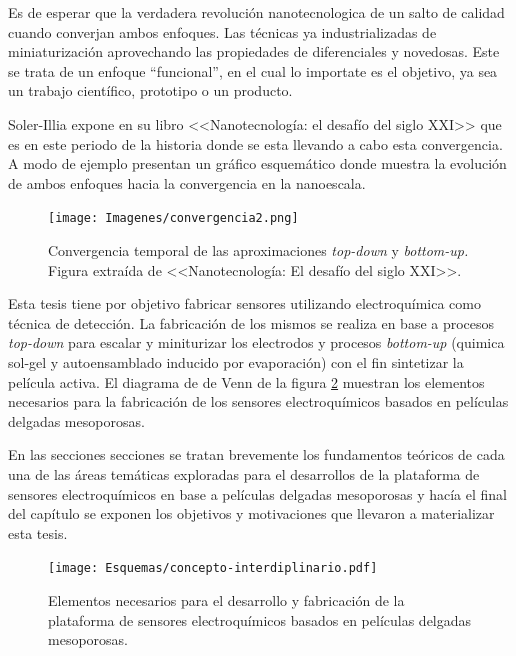 		Es de esperar que la verdadera revolución nanotecnologica de un salto de calidad cuando converjan ambos enfoques. Las técnicas ya industrializadas de miniaturización aprovechando las propiedades de diferenciales y novedosas. Este se trata de un enfoque ``funcional'', en el cual lo importate es el objetivo, ya sea un trabajo científico, prototipo o un producto.

		Soler-Illia expone en su libro <<Nanotecnología: el desafío del siglo XXI>>\cite{nanotecnologia-galo} que es en este periodo de la historia donde se esta llevando a cabo esta convergencia. A modo de ejemplo presentan un gráfico esquemático donde muestra la evolución de ambos enfoques hacia la convergencia en la nanoescala.

			\begin{figure}[ht!]
 				\begin{center}
 				\texttt{[image: Imagenes/convergencia2.png]}
 				\caption[Convergencia \textit{top-down }y \textit{bottom-up.}]{Convergencia temporal de las aproximaciones \textit{top-down }y \textit{bottom-up.} Figura extraída de <<Nanotecnología: El desafío del siglo XXI>>.}
 				\label{fig:galo-convergencia}
 		   	    \end{center}
 		   	    \end{figure}

    	Esta tesis tiene por objetivo fabricar sensores utilizando electroquímica como técnica de detección. La fabricación de los mismos se realiza en base a procesos \textit{top-down} para escalar y miniturizar los electrodos y procesos \textit{bottom-up} (quimica sol-gel y autoensamblado inducido por evaporación) con el fin sintetizar la película activa. El diagrama de  de Venn de la figura \ref{fig:sensores} muestran los elementos necesarios para la fabricación de los sensores electroquímicos basados en películas delgadas mesoporosas. 
	 	
 		En las secciones secciones se tratan brevemente los fundamentos teóricos de cada una de las áreas temáticas exploradas para el desarrollos de la plataforma de sensores electroquímicos en base a películas delgadas mesoporosas y hacía el final del capítulo se exponen los objetivos y motivaciones que llevaron a materializar esta tesis.


	       \begin{figure}[ht!]
 				\begin{center}
 				\texttt{[image: Esquemas/concepto-interdiplinario.pdf]}
 				\caption[Plataforma de sensores. Diagrama de Venn.]{Elementos necesarios para el desarrollo y fabricación de la plataforma de sensores electroquímicos basados en películas delgadas mesoporosas.}
 		   		\label{fig:sensores}
 		    	\end{center}
 		    	\end{figure}
